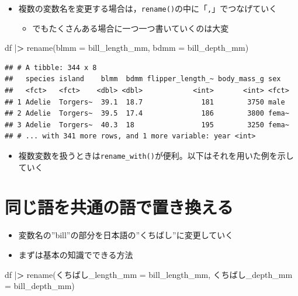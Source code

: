 \documentclass[
  xelatex,ja=standard, b5paper]{bxjsbook}
\newenvironment{Shaded}{\begin{snugshade}}{\end{snugshade}}
\newcommand{\AttributeTok}[1]{\textcolor[rgb]{0.77,0.63,0.00}{#1}}
\newcommand{\ErrorTok}[1]{\textcolor[rgb]{0.64,0.00,0.00}{\textbf{#1}}}
\newcommand{\FunctionTok}[1]{\textcolor[rgb]{0.00,0.00,0.00}{#1}}
\newcommand{\NormalTok}[1]{#1}
\newcommand{\SpecialCharTok}[1]{\textcolor[rgb]{0.00,0.00,0.00}{#1}}
\providecommand{\tightlist}{%
  \setlength{\itemsep}{0pt}\setlength{\parskip}{0pt}}
\begin{document}
\begin{itemize}
\tightlist
\item
  複数の変数名を変更する場合は，\texttt{rename()}の中に「\texttt{,}」でつなげていく

  \begin{itemize}
  \tightlist
  \item
    でもたくさんある場合に一つ一つ書いていくのは大変
  \end{itemize}
\end{itemize}

\begin{Shaded}
\begin{Highlighting}[]
\NormalTok{df }\SpecialCharTok{|}\ErrorTok{\textgreater{}} 
  \FunctionTok{rename}\NormalTok{(}\AttributeTok{blmm =}\NormalTok{ bill\_length\_mm,}
         \AttributeTok{bdmm =}\NormalTok{ bill\_depth\_mm)}
\end{Highlighting}
\end{Shaded}

\begin{verbatim}
## # A tibble: 344 x 8
##   species island    blmm  bdmm flipper_length_~ body_mass_g sex  
##   <fct>   <fct>    <dbl> <dbl>            <int>       <int> <fct>
## 1 Adelie  Torgers~  39.1  18.7              181        3750 male 
## 2 Adelie  Torgers~  39.5  17.4              186        3800 fema~
## 3 Adelie  Torgers~  40.3  18                195        3250 fema~
## # ... with 341 more rows, and 1 more variable: year <int>
\end{verbatim}

\begin{itemize}
\tightlist
\item
  複数変数を扱うときは\texttt{rename\_with()}が便利。以下はそれを用いた例を示していく
\end{itemize}

\hypertarget{rename-samew}{%
\section{同じ語を共通の語で置き換える}\label{rename-samew}}

\begin{itemize}
\tightlist
\item
  変数名の''bill''の部分を日本語の''くちばし''に変更していく
\item
  まずは基本の知識でできる方法
\end{itemize}

\begin{Shaded}
\begin{Highlighting}[]
\NormalTok{df }\SpecialCharTok{|}\ErrorTok{\textgreater{}} 
  \FunctionTok{rename}\NormalTok{(くちばし}\AttributeTok{\_length\_mm =}\NormalTok{ bill\_length\_mm,}
\NormalTok{         くちばし}\AttributeTok{\_depth\_mm =}\NormalTok{ bill\_depth\_mm)}
\end{Highlighting}
\end{Shaded}
\end{document}
